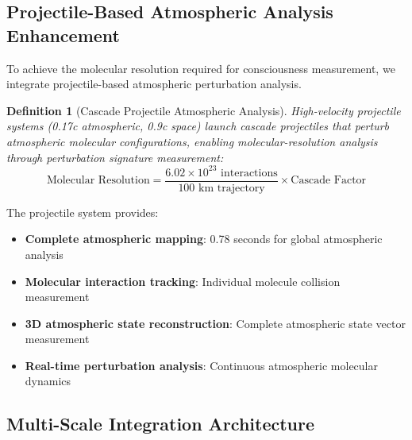\documentclass[12pt,a4paper]{article}
\newtheorem{definition}{Definition}
\begin{document}
\subsection{Projectile-Based Atmospheric Analysis Enhancement}

To achieve the molecular resolution required for consciousness measurement, we integrate projectile-based atmospheric perturbation analysis.

\begin{definition}[Cascade Projectile Atmospheric Analysis]
High-velocity projectile systems (0.17c atmospheric, 0.9c space) launch cascade projectiles that perturb atmospheric molecular configurations, enabling molecular-resolution analysis through perturbation signature measurement:
\begin{equation}
\text{Molecular Resolution} = \frac{6.02 \times 10^{23} \text{ interactions}}{100 \text{ km trajectory}} \times \text{Cascade Factor}
\end{equation}
\end{definition}

The projectile system provides:
\begin{itemize}
\item \textbf{Complete atmospheric mapping}: 0.78 seconds for global atmospheric analysis
\item \textbf{Molecular interaction tracking}: Individual molecule collision measurement
\item \textbf{3D atmospheric state reconstruction}: Complete atmospheric state vector measurement
\item \textbf{Real-time perturbation analysis}: Continuous atmospheric molecular dynamics
\end{itemize}

\subsection{Multi-Scale Integration Architecture}
\end{document}
